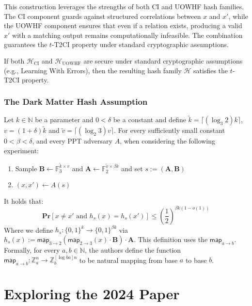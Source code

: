 \documentclass[12pt]{article}%
\newcommand{\Z}{\mathbb{Z}}
\newcommand{\N}{\mathbb{N}}
\begin{document}
This construction leverages the strengths of both CI and UOWHF hash families. The CI component guards against structured correlations between $x$ and $x'$, while the UOWHF component ensures that even if a relation exists, producing a valid $x'$ with a matching output remains computationally infeasible. The combination guarantees the $t$-T2CI property under standard cryptographic assumptions.

If both $\mathcal{H}_{\mathrm{CI}}$ and $\mathcal{H}_{\mathrm{UOWHF}}$ are secure under standard cryptographic assumptions (e.g., Learning With Errors), then the resulting hash family $\mathcal{H}$ satisfies the $t$-T2CI property.

\subsubsection{The Dark Matter Hash Assumption}
Let $k \in \N$ be a parameter and $0 < \delta$ be a constant and define $\tilde{k} = \lceil (\log_3 2) k \rceil$, $v = (1 + \delta) \tilde{k}$ and $\tilde{v} = \lceil (\log_2 3) v \rceil$. For every sufficiently small constant $0 < \beta < \delta$, and every PPT adversary $A$, when considering the following experiment: \begin{enumerate}
    \item Sample $\textbf{B} \xleftarrow{} \mathbb{F}_3^{\tilde{k} \times v}$ and $\textbf{A} \xleftarrow{} \mathbb{F}_2^{\tilde{v} \times \beta k}$ and set $s:=(\textbf{A}, \textbf{B})$
    \item $(x, x') \xleftarrow{} A(s)$
\end{enumerate} It holds that: $$\textbf{Pr}[x \neq x' \text{ and } h_s(x) = h_s(x')] \leq \left( \frac{1}{2} \right)^{\beta k (1 - o(1))}$$ Where we define $h_s: \{0, 1\}^k \to \{0, 1\}^{\beta k}$ via $h_s(x) := \textsf{map}_{3 \to 2}(\textsf{map}_{2 \to 3}(x) \cdot \textbf{B}) \cdot \textbf{A}$. This definition uses the $\textsf{map}_{a \to b}$. Formally, for every $a, b \in \N$, the authors define the function $\textsf{map}_{a \to b}: \Z_a^n \to \Z_b^{[\log b a]n}$ to be natural mapping from base $a$ to base $b$. 


\section{Exploring the 2024 Paper}
\end{document}
